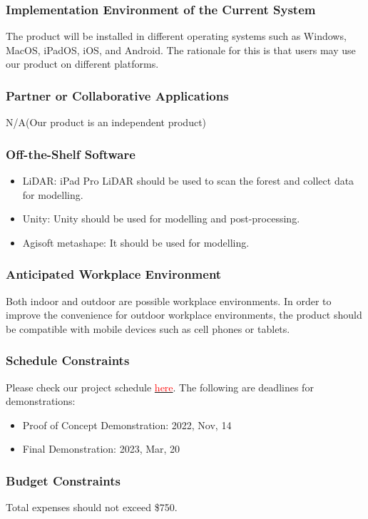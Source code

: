 \documentclass{article}
\begin{document}
\subsubsection{Implementation Environment of the Current System}
The product will be installed in different operating systems such
as Windows, MacOS, iPadOS, iOS, and Android. The rationale for this is that users may use our product on different platforms.
\subsubsection{Partner or Collaborative Applications}
N/A(Our product is an independent product)
\subsubsection{Off-the-Shelf Software}
\begin{itemize}
    \item LiDAR: iPad Pro LiDAR should be used to scan the forest and collect data
    for modelling.
    \item Unity: Unity should be used for modelling and post-processing.
    \item Agisoft metashape: It should be used for modelling.
\end{itemize}
\subsubsection{Anticipated Workplace Environment}
Both indoor and outdoor are possible workplace environments. In order to 
improve the convenience for outdoor workplace environments, 
the product should be compatible with mobile devices such
as cell phones or tablets.
\subsubsection{Schedule Constraints}
Please check our project schedule \href{https://github.com/wuj187/DigitalTwinCAS/tree/main/docs/DevelopmentPlan/Project_Schedule}{\textcolor{red}{here}}. The following are deadlines for demonstrations:
\begin{itemize}
    \item Proof of Concept Demonstration: 2022, Nov, 14
    \item Final Demonstration: 2023, Mar, 20
\end{itemize}
\subsubsection{Budget Constraints}
Total expenses should not exceed \$750.
\end{document}
